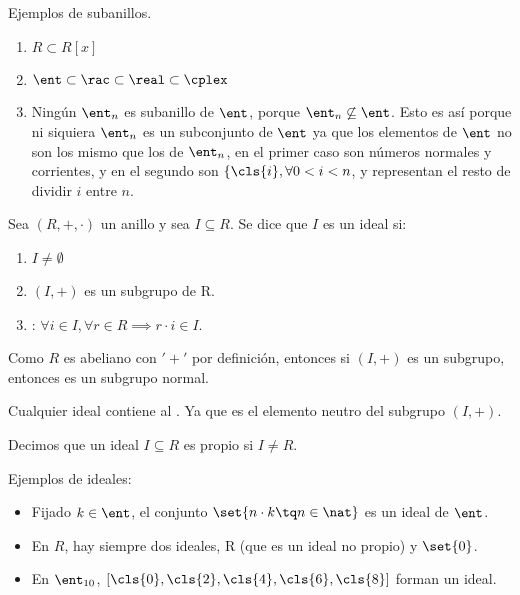 \begin{example} Ejemplos de subanillos.
	\begin{enumerate}
		\item $R \subset R[x]$
		\item $\ent \subset \rac \subset \real \subset \cplex$
		\item Ningún $\ent_n$ es subanillo de $\ent$, porque $\ent_n \not \subseteq \ent$. Esto es así porque ni siquiera $\ent_n$ es un subconjunto de $\ent$ ya que los elementos de $\ent$ no son los mismo que los de $\ent_n$, en el primer caso son números normales y corrientes, y en el segundo son $\{\cls{i},  \forall 0 < i < n$, y representan el resto de dividir $i$ entre $n$.
	\end{enumerate}
\end{example}


\begin{defn}[Ideal] \label{def:Ideal} %
Sea $(R,+,\cdot)$ un anillo y sea $I \subseteq R$. Se dice que $I$ es un ideal si:

	\begin{enumerate}
		\item $I \neq \emptyset$
		\item $(I, +)$ es un subgrupo de R.
		\item {}: $\forall i \in I, \forall r \in R \implies r\cdot i \in I$.
	\end{enumerate}
\end{defn}

\obs Como $R$ es abeliano con  $'+'$ por definición, entonces si $(I,+)$ es un subgrupo, entonces es un subgrupo normal.

\obs Cualquier ideal contiene al \zero. Ya que es el elemento neutro del subgrupo $(I,+)$.

\begin{defn}
	Decimos que un ideal $I \subseteq R$ es propio si $I \neq R$.
\end{defn}

\begin{example} Ejemplos de ideales:
	\begin{itemize}
		\item Fijado $k \in \ent$, el conjunto $\set{n\cdot k \tq n \in \nat }$ es un ideal de $\ent$.
		\item En $R$, hay siempre dos ideales, R (que es un ideal no propio) y $\set{0}$.
		\item En $\ent_{10}$, $[\cls{0},\cls{2},\cls{4},\cls{6},\cls{8} ]$ forman un ideal.
	\end{itemize}
\end{example}

